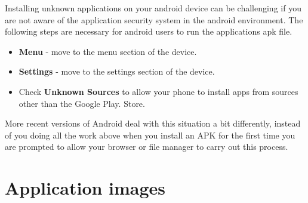 \documentclass[a4paper,12pt]{report}
\begin{document}
Installing unknown applications on your android device can be challenging if you are not aware of the application security system in the android environment.
The following steps are necessary for android users to run the applications apk file.
\begin{itemize}
    \item \textbf{Menu} - move to the menu section of the device.
    \item \textbf{Settings} - move to the settings section of the device.
    \item Check \textbf{Unknown Sources} to allow your phone to install apps from sources other than the Google Play. Store.
\end{itemize}
More recent versions of Android deal with this situation a bit differently, instead of you doing all the work above when you install an APK for the first time you are prompted to allow your browser or file manager to carry out this process.\cite{apkFiles} 

\section{Application images}
\end{document}
